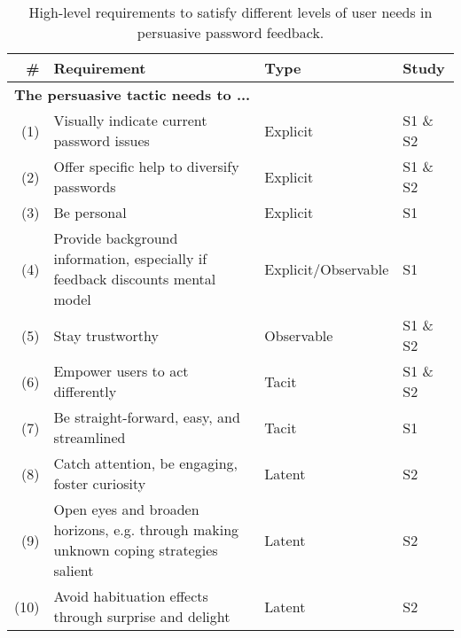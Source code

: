 \begin{table}[htbp]
\begin{tabular}{rp{10cm}ll}
	\# & Requirement & Type & Study \\\hline
	\multicolumn{4}{l}{\textbf{The persuasive tactic needs to ...}} \\\hline
	(1) & Visually indicate current password issues & Explicit & S1 \& S2 \\
	(2) & Offer specific help to diversify passwords & Explicit & S1 \& S2  \\		
	(3) & Be personal & Explicit & S1  \\
	(4) & Provide background information, especially if feedback discounts mental model 
	& Explicit/Observable & S1 \\
	(5) & Stay trustworthy & Observable & S1 \& S2  \\
	(6) & Empower users to act differently & Tacit & S1 \& S2  \\
	(7) & Be straight-forward, easy, and streamlined & Tacit & S1  \\
	(8) & Catch attention, be engaging, foster curiosity & Latent & S2  \\	
	(9) & Open eyes and broaden horizons, e.g. through making unknown coping strategies salient & Latent & S2  \\
	(10) & Avoid habituation effects through surprise and delight & Latent & S2  \\\hline
\end{tabular}
\caption{\label{tab:co-design:requirements} High-level requirements to satisfy different levels of user needs in persuasive password feedback. }
\end{table}